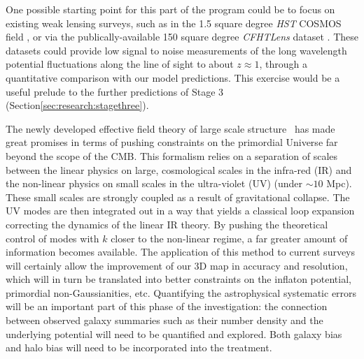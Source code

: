 \documentclass[psfig,12pt]{article}
\def\ni{\noindent}
\begin{document}
{One possible starting point for this part of the program could be to
focus on existing weak lensing surveys, such as in the 1.5 square degree
{\it HST} COSMOS field \cite{MasseyEtal2007}, or via  the
publically-available 150 square degree {\it CFHTLens} dataset
\cite{HeymansEtal2012}. These datasets could provide
low signal to noise measurements of the long wavelength potential
fluctuations along the line of sight to about $z \approx 1$,
through  a quantitative comparison with our model predictions. This
exercise would be a useful prelude to the further predictions of Stage 3
(Section\ref{sec:research:stagethree}).


\ni{\bf Further Constraints on Inflation:}
The newly developed effective field theory of large scale
structure~\cite{Carrasco2012} has made great promises in terms of
pushing constraints on the primordial Universe far beyond the scope of
the CMB. This formalism relies on a separation of scales between the
linear physics on large, cosmological scales in the infra-red (IR) and
the non-linear physics on small scales in the ultra-violet (UV) (under
$\sim10$ Mpc). These small scales are strongly coupled as a result of
gravitational collapse. The UV modes are then integrated out in a way
that yields a classical loop expansion correcting the dynamics of the
linear IR theory. By pushing the theoretical control of modes with $k$
closer to the non-linear regime, a far greater amount of information
becomes available. The application of this method to current
surveys will certainly allow the improvement of our 3D map in
accuracy and resolution, which will in turn be translated into better
constraints on the inflaton potential, primordial non-Gaussianities,
etc. Quantifying the astrophysical systematic errors will be an
important part of this phase of the investigation: the connection
between observed galaxy summaries such as their number density and the
underlying potential will need to be quantified and explored. Both
galaxy bias and halo bias will need to be incorporated into the
treatment.

}
\end{document}
